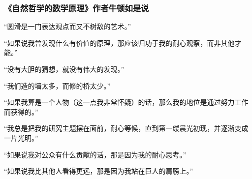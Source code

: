 \subsubsection*{《自然哲学的数学原理》作者牛顿如是说}

“圆滑是一门表达观点而又不树敌的艺术。”
\par

“如果说我曾发现什么有价值的原理，那应该归功于我的耐心观察，而非其他才能。”
\par

“没有大胆的猜想，就没有伟大的发现。”
\par

“我们造的墙太多，而修的桥太少。”
\par

“如果我算是一个人物（这一点我非常怀疑）的话，那么我的地位是通过努力工作而获得的。”
\par

“我总是把我的研究主题摆在面前，耐心等候，直到第一缕晨光初现，并逐渐变成一片光明。”
\par

“如果说我对公众有什么贡献的话，那是因为我的耐心思考。”
\par

“如果说我比其他人看得更远，那是因为我站在巨人的肩膀上。”
\par
